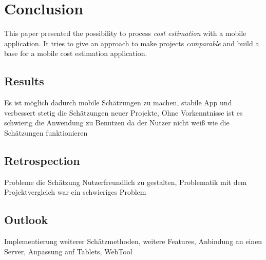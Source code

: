 \chapter{Conclusion}

This paper presented the possibility to process \textit{cost estimation} with a mobile application. It tries to give an approach to make projects \textit{comparable} and build a base for a mobile cost estimation application.

\section{Results}\label{result}

Es ist möglich dadurch mobile Schätzungen zu machen, stabile App und verbessert stetig die Schätzungen neuer Projekte, Ohne Vorkenntnisse ist es schwierig die Anwendung zu Benutzen da der  Nutzer nicht weiß wie die Schätzungen funktionieren

\section{Retrospection}

Probleme die Schätzung Nutzerfreundlich zu gestalten, Problematik mit dem Projektvergleich war ein schwieriges Problem

\section{Outlook}

Implementierung weiterer Schätzmethoden, weitere Features, Anbindung an einen Server, Anpassung auf Tablets, WebTool